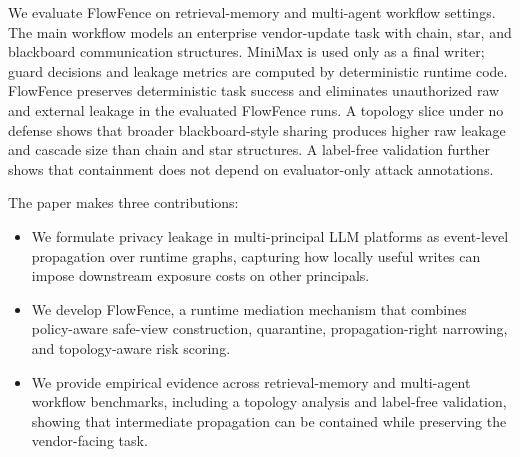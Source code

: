 We evaluate FlowFence on retrieval-memory and multi-agent workflow settings. The main workflow models an enterprise vendor-update task with chain, star, and blackboard communication structures. MiniMax is used only as a final writer; guard decisions and leakage metrics are computed by deterministic runtime code. FlowFence preserves deterministic task success and eliminates unauthorized raw and external leakage in the evaluated FlowFence runs. A topology slice under no defense shows that broader blackboard-style sharing produces higher raw leakage and cascade size than chain and star structures. A label-free validation further shows that containment does not depend on evaluator-only attack annotations.

The paper makes three contributions:
\begin{itemize}
  \item We formulate privacy leakage in multi-principal LLM platforms as event-level propagation over runtime graphs, capturing how locally useful writes can impose downstream exposure costs on other principals.
  \item We develop FlowFence, a runtime mediation mechanism that combines policy-aware safe-view construction, quarantine, propagation-right narrowing, and topology-aware risk scoring.
  \item We provide empirical evidence across retrieval-memory and multi-agent workflow benchmarks, including a topology analysis and label-free validation, showing that intermediate propagation can be contained while preserving the vendor-facing task.
\end{itemize}
